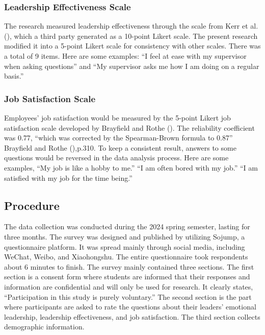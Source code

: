 \documentclass[
  man,
  longtable,
  nolmodern,
  notxfonts,
  notimes,
  colorlinks=true,linkcolor=blue,citecolor=blue,urlcolor=blue]{apa7}
\begin{document}
\subsubsection{Leadership Effectiveness
Scale}\label{leadership-effectiveness-scale}

The research measured leadership effectiveness through the scale from
Kerr et al. (), which a third party
generated as a 10-point Likert scale. The present research modified it
into a 5-point Likert scale for consistency with other scales. There was
a total of 9 items. Here are some examples: ``I feel at ease with my
supervisor when asking questions'' and ``My supervisor asks me how I am
doing on a regular basis.''

\subsubsection{Job Satisfaction Scale}\label{job-satisfaction-scale}

Employees' job satisfaction would be measured by the 5-point Likert job
satisfaction scale developed by Brayfield and Rothe
(). The reliability coefficient was
0.77, ``which was corrected by the Spearman-Brown formula to 0.87''
Brayfield and Rothe (),p.310. To keep
a consistent result, answers to some questions would be reversed in the
data analysis process. Here are some examples, ``My job is like a hobby
to me.'' ``I am often bored with my job.'' ``I am satisfied with my job
for the time being.''

\subsection{Procedure}\label{procedure}

The data collection was conducted during the 2024 spring semester,
lasting for three months. The survey was designed and published by
utilizing Sojump, a questionnaire platform. It was spread mainly through
social media, including WeChat, Weibo, and Xiaohongshu. The entire
questionnaire took respondents about 6 minutes to finish. The survey
mainly contained three sections. The first section is a consent form
where students are informed that their responses and information are
confidential and will only be used for research. It clearly states,
``Participation in this study is purely voluntary.'' The second section
is the part where participants are asked to rate the questions about
their leaders' emotional leadership, leadership effectiveness, and job
satisfaction. The third section collects demographic information.
\end{document}
